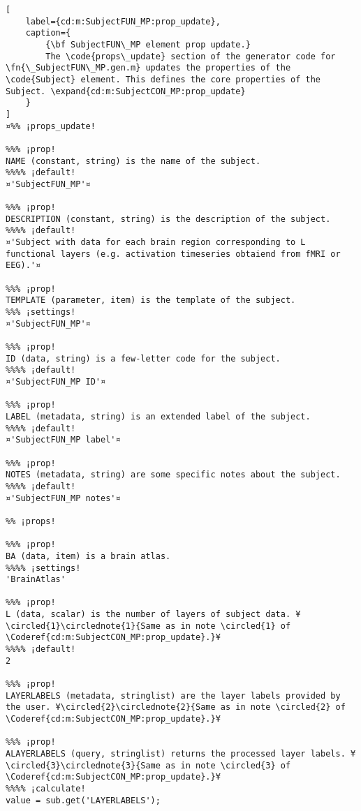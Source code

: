 \documentclass{tufte-handout}
\begin{document}
\begin{lstlisting}[
	label={cd:m:SubjectFUN_MP:prop_update},
	caption={
		{\bf SubjectFUN\_MP element prop update.}
		The \code{props\_update} section of the generator code for \fn{\_SubjectFUN\_MP.gen.m} updates the properties of the \code{Subject} element. This defines the core properties of the Subject. \expand{cd:m:SubjectCON_MP:prop_update}
	}
]
¤%% ¡props_update!

%%% ¡prop!
NAME (constant, string) is the name of the subject.
%%%% ¡default!
¤'SubjectFUN_MP'¤

%%% ¡prop!
DESCRIPTION (constant, string) is the description of the subject.
%%%% ¡default!
¤'Subject with data for each brain region corresponding to L functional layers (e.g. activation timeseries obtaiend from fMRI or EEG).'¤

%%% ¡prop!
TEMPLATE (parameter, item) is the template of the subject.
%%% ¡settings!
¤'SubjectFUN_MP'¤

%%% ¡prop!
ID (data, string) is a few-letter code for the subject.
%%%% ¡default!
¤'SubjectFUN_MP ID'¤

%%% ¡prop!
LABEL (metadata, string) is an extended label of the subject.
%%%% ¡default!
¤'SubjectFUN_MP label'¤

%%% ¡prop!
NOTES (metadata, string) are some specific notes about the subject.
%%%% ¡default!
¤'SubjectFUN_MP notes'¤

%% ¡props!

%%% ¡prop!
BA (data, item) is a brain atlas.
%%%% ¡settings!
'BrainAtlas'

%%% ¡prop!
L (data, scalar) is the number of layers of subject data. ¥\circled{1}\circlednote{1}{Same as in note \circled{1} of \Coderef{cd:m:SubjectCON_MP:prop_update}.}¥
%%%% ¡default!
2

%%% ¡prop!
LAYERLABELS (metadata, stringlist) are the layer labels provided by the user. ¥\circled{2}\circlednote{2}{Same as in note \circled{2} of \Coderef{cd:m:SubjectCON_MP:prop_update}.}¥

%%% ¡prop!
ALAYERLABELS (query, stringlist) returns the processed layer labels. ¥\circled{3}\circlednote{3}{Same as in note \circled{3} of \Coderef{cd:m:SubjectCON_MP:prop_update}.}¥
%%%% ¡calculate!
value = sub.get('LAYERLABELS');


\end{lstlisting}
\end{document}
